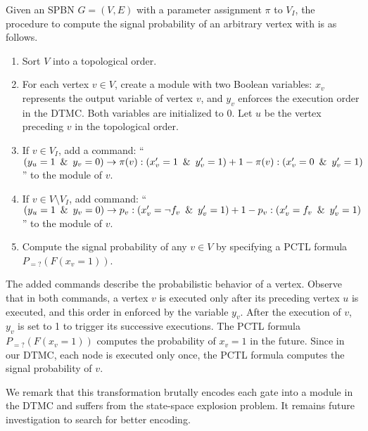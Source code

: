 Given an SPBN $G=(V,E)$ with a parameter assignment $\pi$ to $V_I$,
the procedure to compute the signal probability of an arbitrary vertex with \prism is as follows.
\begin{enumerate}
    \item Sort $V$ into a topological order.
    \item For each vertex $v\in V$, create a module with two Boolean variables:
          $x_v$ represents the output variable of vertex $v$,
          and $y_v$ enforces the execution order in the DTMC.
          Both variables are initialized to $0$.
          Let $u$ be the vertex preceding $v$ in the topological order.
    \item If $v\in V_I$, add a command:
          ``$(y_u=1 \enskip\&\enskip y_v=0) \rightarrow
              \pi(v):(x_v'=1 \enskip\&\enskip y_v'=1)+
              1-\pi(v):(x_v'=0 \enskip\&\enskip y_v'=1)$''
          to the module of $v$.
    \item If $v\in V\setminus V_I$, add command:
          ``$(y_u=1 \enskip\&\enskip y_v=0) \rightarrow
              p_v:(x_v'=\neg f_v \enskip\&\enskip y_v'=1)+
              1-p_v:(x_v'=f_v \enskip\&\enskip y_v'=1)$''
          to the module of $v$.
    \item Compute the signal probability of any $v\in V$ by specifying a PCTL formula $P_{=?}(F(x_v=1))$.
\end{enumerate}

The added commands describe the probabilistic behavior of a vertex.
Observe that in both commands,
a vertex $v$ is executed only after its preceding vertex $u$ is executed,
and this order in enforced by the variable $y_v$.
After the execution of $v$,
$y_v$ is set to 1 to trigger its successive executions.
The PCTL formula $P_{=?}(F(x_v=1))$ computes the probability of $x_v=1$ in the future.
Since in our DTMC, each node is executed only once,
the PCTL formula computes the signal probability of $v$.

We remark that this transformation brutally encodes each gate into a module in the DTMC and suffers from the state-space explosion problem.
It remains future investigation to search for better encoding.